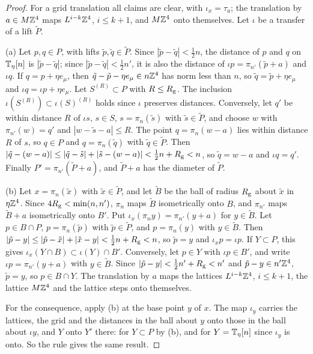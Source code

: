 \begin{proof}
For a grid translation all claims are clear, with $\iota_x=\tau_a$; the translation by $a\in M\mathbb Z^4$ maps $L^{i-k}\mathbb Z^4$, $i\le k+1$, and $M\mathbb Z^4$ onto themselves. Let $\iota$ be a transfer of a lift $\tilde P$.

(a) Let $p,q\in P$, with lifts $\tilde p,\tilde q\in\tilde P$. Since $|\tilde p-\tilde q|<\frac12n$, the distance of $p$ and $q$ on $\mathbb T_\eta[n]$ is $|\tilde p-\tilde q|$; since $|\tilde p-\tilde q|<\frac12n'$, it is also the distance of $\iota p=\pi_{n'}(\tilde p+a)$ and $\iota q$. If $q=p+\eta e_\mu$, then $\tilde q-\tilde p-\eta e_\mu\in n\mathbb Z^4$ has norm less than $n$, so $\tilde q=\tilde p+\eta e_\mu$ and $\iota q=\iota p+\eta e_\mu$. Let $S^{(R)}\subset P$ with $R\le R_{\rm g}$. The inclusion $\iota(S^{(R)})\subset\iota(S)^{(R)}$ holds since $\iota$ preserves distances. Conversely, let $q'$ be within distance $R$ of $\iota s$, $s\in S$, $s=\pi_n(\tilde s)$ with $\tilde s\in\tilde P$, and choose $w$ with $\pi_{n'}(w)=q'$ and $|w-\tilde s-a|\le R$. The point $q=\pi_n(w-a)$ lies within distance $R$ of $s$, so $q\in P$ and $q=\pi_n(\tilde q)$ with $\tilde q\in\tilde P$. Then $|\tilde q-(w-a)|\le|\tilde q-\tilde s|+|\tilde s-(w-a)|<\frac12n+R_{\rm g}<n$, so $\tilde q=w-a$ and $\iota q=q'$. Finally $P'=\pi_{n'}(\tilde P+a)$, and $\tilde P+a$ has the diameter of $\tilde P$.

(b) Let $x=\pi_n(\tilde x)$ with $\tilde x\in\tilde P$, and let $\tilde B$ be the ball of radius $R_{\rm g}$ about $\tilde x$ in $\eta\mathbb Z^4$. Since $4R_{\rm g}<\min(n,n')$, $\pi_n$ maps $\tilde B$ isometrically onto $B$, and $\pi_{n'}$ maps $\tilde B+a$ isometrically onto $B'$. Put $\iota_x(\pi_ny)=\pi_{n'}(y+a)$ for $y\in\tilde B$. Let $p\in B\cap P$, $p=\pi_n(\tilde p)$ with $\tilde p\in\tilde P$, and $p=\pi_n(y)$ with $y\in\tilde B$. Then $|\tilde p-y|\le|\tilde p-\tilde x|+|\tilde x-y|<\frac12n+R_{\rm g}<n$, so $\tilde p=y$ and $\iota_xp=\iota p$. If $Y\subset P$, this gives $\iota_x(Y\cap B)\subset\iota(Y)\cap B'$. Conversely, let $p\in Y$ with $\iota p\in B'$, and write $\iota p=\pi_{n'}(y+a)$ with $y\in\tilde B$. Since $|\tilde p-y|<\frac12n'+R_{\rm g}<n'$ and $\tilde p-y\in n'\mathbb Z^4$, $\tilde p=y$, so $p\in B\cap Y$. The translation by $a$ maps the lattices $L^{i-k}\mathbb Z^4$, $i\le k+1$, the lattice $M\mathbb Z^4$ and the lattice steps onto themselves.

For the consequence, apply (b) at the base point $y$ of $x$. The map $\iota_y$ carries the lattices, the grid and the distances in the ball about $y$ onto those in the ball about $\iota y$, and $Y$ onto $Y'$ there: for $Y\subset P$ by (b), and for $Y=\mathbb T_\eta[n]$ since $\iota_y$ is onto. So the rule gives the same result.
\end{proof}

